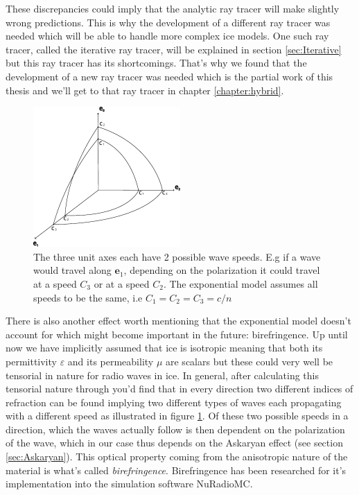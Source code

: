These discrepancies could imply that the analytic ray tracer will
make slightly wrong predictions.  This is why the development of a different
ray tracer was needed which will be able to handle more complex ice models. One
such ray tracer, called the iterative ray tracer, will be explained in section \ref{sec:Iterative} but this ray
tracer has its shortcomings. That's why we found that the development of a new ray tracer
was needed which is the partial work of this thesis and we'll get to that ray
tracer in chapter \ref{chapter:hybrid}.


\begin{figure}
  \centering
  \includegraphics[width=0.5\textwidth]{figures/Fresnel.pdf}
  \caption{The three unit axes each have 2 possible wave speeds. E.g if a wave would
  travel along $\mathbf{e}_1$, depending on the polarization it could travel at a speed $C_3$ or
  at a speed $C_2$. The exponential model assumes all speeds to be the same, i.e $C_1=C_2=C_3=c/n$}
  \label{fig:Fresnel}
\end{figure}

There is also another effect worth mentioning that the exponential model
doesn't account for which might become important in the future: birefringence.
Up until now we have implicitly assumed that ice is isotropic meaning that both
its permittivity $\varepsilon$ and its permeability $\mu$ are scalars but
these could very well be tensorial in nature for radio waves in ice. In
general, after calculating this tensorial nature through you'd find that in
every direction two different indices of refraction can be found implying two
different types of waves each propagating with a different speed as illustrated
in figure \ref{fig:Fresnel}.  Of these two possible speeds in a direction, which the waves actually
follow is then dependent on the polarization of the wave, which in our case thus depends
on the Askaryan effect (see section \ref{sec:Askaryan}).  This optical property
coming from the anisotropic nature of the material is what's called
\textit{birefringence}.  Birefringence has been researched for it's
implementation into the simulation software NuRadioMC\cite{Heyer2023}.
\newpage
